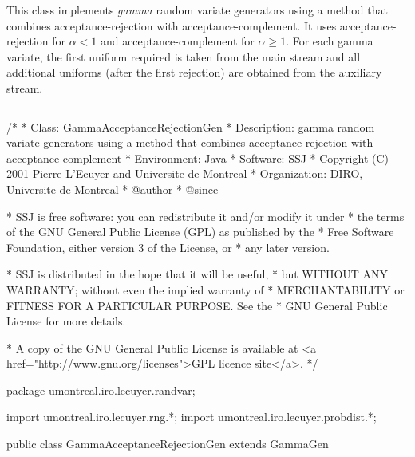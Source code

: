 
This class implements {\em gamma\/} random variate generators using
a method that combines acceptance-rejection 
with acceptance-complement.
It uses acceptance-rejection for $\alpha<1$ and acceptance-complement
for $\alpha\ge 1$.
For each gamma variate, the first uniform required is taken from the 
main stream and all additional uniforms (after the first rejection)
are obtained from the auxiliary stream.

\bigskip\hrule

\begin{code}
\begin{hide}
/*
 * Class:        GammaAcceptanceRejectionGen
 * Description:  gamma random variate generators using a method that combines
                 acceptance-rejection with acceptance-complement
 * Environment:  Java
 * Software:     SSJ 
 * Copyright (C) 2001  Pierre L'Ecuyer and Universite de Montreal
 * Organization: DIRO, Universite de Montreal
 * @author       
 * @since

 * SSJ is free software: you can redistribute it and/or modify it under
 * the terms of the GNU General Public License (GPL) as published by the
 * Free Software Foundation, either version 3 of the License, or
 * any later version.

 * SSJ is distributed in the hope that it will be useful,
 * but WITHOUT ANY WARRANTY; without even the implied warranty of
 * MERCHANTABILITY or FITNESS FOR A PARTICULAR PURPOSE.  See the
 * GNU General Public License for more details.

 * A copy of the GNU General Public License is available at
   <a href="http://www.gnu.org/licenses">GPL licence site</a>.
 */
\end{hide}
package umontreal.iro.lecuyer.randvar;\begin{hide}
import umontreal.iro.lecuyer.rng.*;
import umontreal.iro.lecuyer.probdist.*;
\end{hide}

public class GammaAcceptanceRejectionGen extends GammaGen \begin{hide} {
    
}
\end{hide}
\end{code}
